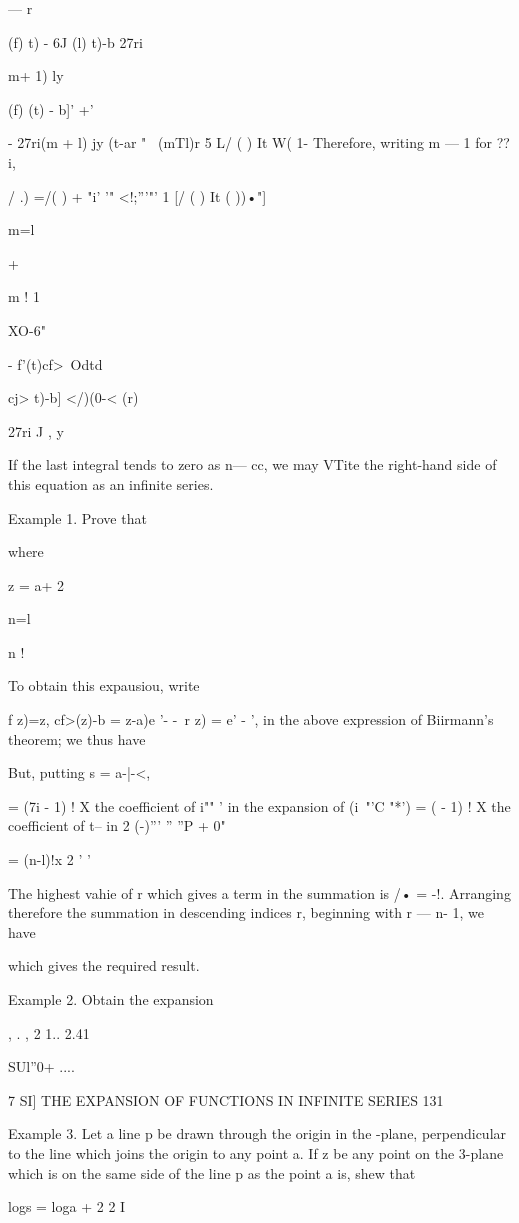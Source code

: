 — r

(f) t) - 6J (l) t)-b 27ri

 m+ 1) ly

 (f) (t) - b]' +'

- 27ri(m + l) jy (t-ar " ~(mTl)r 5 L/ ( ) It W( 1- Therefore, writing
m — 1 for ??i,

/ .) =/( ) + "i' '" <!;'''"' 1 [/ ( ) It ( ))•"]

m=l

+

m ! 1

XO-6"

- f'(t)cf>\ Odtd

cj> t)-b] </)(0-< (r)

27ri J , y

If the last integral tends to zero as n— cc, we may VTite the
right-hand side of this equation as an infinite series.

Example 1. Prove that

where

z = a+ 2

n=l

n !

To obtain this expausiou, write

f z)=z, cf>(z)-b = z-a)e '- -\ r z) = e' - ', in the above expression
of Biirmann's theorem; we thus have

But, putting s = a-|-<,

= (7i - 1) ! X the coefficient of i"" ' in the expansion of (i~"'C
"*') = ( - 1) ! X the coefficient of t-- in 2 (-)''' '' ''P + 0"

= (n-l)!x 2 ' '

The highest vahie of r which gives a term in the summation is /• = -!.
Arranging therefore the summation in descending indices r, beginning
with r — n- 1, we have

which gives the required result.

Example 2. Obtain the expansion

, . , 2 1.. 2.41

SUl''0+ ....

7 SI] THE EXPANSION OF FUNCTIONS IN INFINITE SERIES 131

Example 3. Let a line p be drawn through the origin in the -plane,
perpendicular to the line which joins the origin to any point a. If z
be any point on the 3-plane which is on the same side of the line p as
the point a is, shew that

logs = loga + 2 2 I

